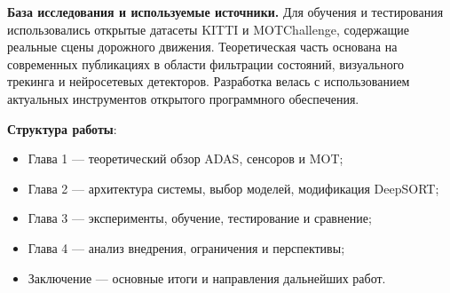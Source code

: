 \textbf{База исследования и используемые источники.} Для обучения и тестирования использовались открытые датасеты KITTI и MOTChallenge, содержащие реальные сцены дорожного движения. Теоретическая часть основана на современных публикациях в области фильтрации состояний, визуального трекинга и нейросетевых детекторов. Разработка велась с использованием актуальных инструментов открытого программного обеспечения.

\textbf{Структура работы}:
\begin{itemize}
    \item Глава 1 — теоретический обзор ADAS, сенсоров и MOT;
    \item Глава 2 — архитектура системы, выбор моделей, модификация DeepSORT;
    \item Глава 3 — эксперименты, обучение, тестирование и сравнение;
    \item Глава 4 — анализ внедрения, ограничения и перспективы;
    \item Заключение — основные итоги и направления дальнейших работ.
\end{itemize}
